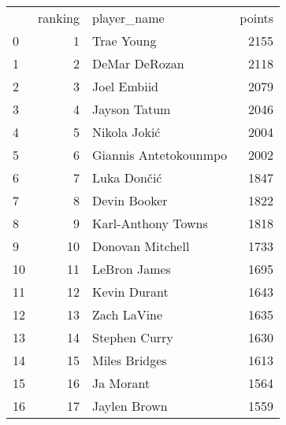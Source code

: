 \begin{tabular}{lrlr}

{} &  ranking &            player\_name &  points \\

0  &        1 &             Trae Young &    2155 \\
1  &        2 &          DeMar DeRozan &    2118 \\
2  &        3 &            Joel Embiid &    2079 \\
3  &        4 &           Jayson Tatum &    2046 \\
4  &        5 &           Nikola Jokić &    2004 \\
5  &        6 &  Giannis Antetokounmpo &    2002 \\
6  &        7 &            Luka Dončić &    1847 \\
7  &        8 &           Devin Booker &    1822 \\
8  &        9 &     Karl-Anthony Towns &    1818 \\
9  &       10 &       Donovan Mitchell &    1733 \\
10 &       11 &           LeBron James &    1695 \\
11 &       12 &           Kevin Durant &    1643 \\
12 &       13 &            Zach LaVine &    1635 \\
13 &       14 &          Stephen Curry &    1630 \\
14 &       15 &          Miles Bridges &    1613 \\
15 &       16 &              Ja Morant &    1564 \\
16 &       17 &           Jaylen Brown &    1559 \\

\end{tabular}
